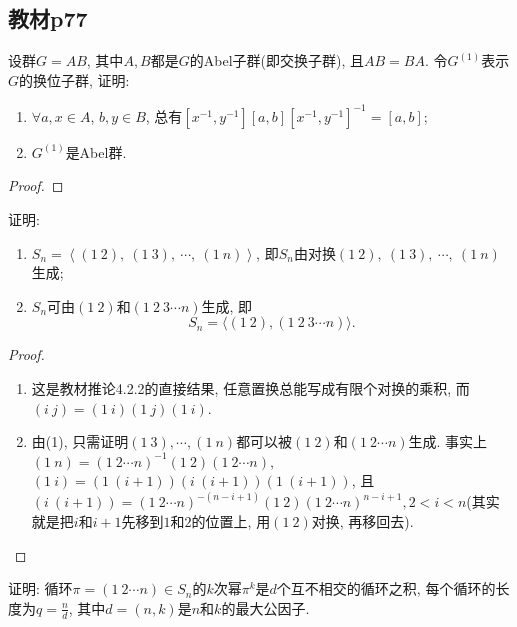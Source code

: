 \subsection{教材p77}

\begin{problem}
    设群$G = AB$, 其中$A, B$都是$G$的Abel子群(即交换子群), 且$AB = BA$. 令$G^{(1)}$表示$G$的换位子群, 证明: 
    \begin{enumerate}[(1)]
        \item $\forall a, x \in A$, $b, y \in B$, 总有$[x^{-1}, y^{-1}][a, b][x^{-1}, y^{-1}]^{-1} = [a, b]$;
        \item $G^{(1)}$是Abel群.
    \end{enumerate}
\end{problem}

\begin{proof}
    
\end{proof}

\begin{problem}
    证明: 
    \begin{enumerate}[(1)]
        \item $S_{n} = \left\langle (1\:2),\: (1\:3),\: \cdots,\: (1\:n) \right\rangle$, 即$S_n$由对换$(1\:2),\: (1\:3),\: \cdots,\: (1\:n)$生成;
        \item $S_{n}$可由$(1\:2)$和$(1\:2\:3 \cdots n)$生成, 即
        \[
            S_n = \big\langle (1\:2),(1\:2\:3 \cdots n) \big\rangle.
        \]
    \end{enumerate}
\end{problem}

\begin{proof}
    \begin{enumerate}[(1)]
        \item 这是教材推论4.2.2的直接结果, 任意置换总能写成有限个对换的乘积, 而$(i\:j) = (1\:i)(1\:j)(1\:i)$.
        \item 由(1), 只需证明$(1\:3), \cdots, (1\:n)$都可以被$(1\:2)$和$(1\:2 \cdots n)$生成. 事实上$(1\:n) = (1\:2 \cdots n)^{-1}(1\:2)(1\:2 \cdots n)$, $(1\:i) = (1\:(i+1))(i\:(i + 1))(1\:(i + 1))$, 且$(i\:(i + 1)) = (1\:2 \cdots n)^{-(n - i + 1)}(1\:2)(1\:2 \cdots n)^{n - i + 1}, 2 < i < n$(其实就是把$i$和$i + 1$先移到$1$和$2$的位置上, 用$(1\:2)$对换, 再移回去).
    \end{enumerate}
\end{proof}

\begin{problem}
    证明: 循环$\pi = (1\:2 \cdots n) \in S_n$的$k$次幂$\pi^k$是$d$个互不相交的循环之积, 每个循环的长度为$q = \frac nd$, 其中$d = (n, k)$是$n$和$k$的最大公因子.
\end{problem}

